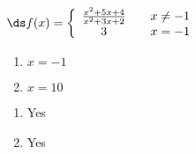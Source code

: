 {$\ds f(x) = \left\{\begin{array}{ccc} 
\frac{x^2+5x+4}{x^2+3x+2}		& &  x\neq -1\\
3 & & x=-1
\end{array}\right.
$
\begin{enumerate}
\item		$x=-1$
\item		$x=10$
\end{enumerate}
}
{\begin{enumerate}
\item		Yes
\item		Yes
\end{enumerate}
}
